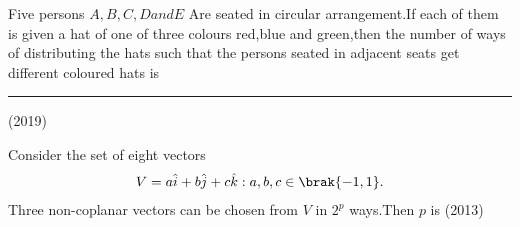 \item Five persons $A,B,C,D and E$ Are seated in circular arrangement.If each of them is given a hat of one of three colours red,blue and green,then the number of ways of distributing the hats such that the persons seated in adjacent seats get different coloured hats is \rule{1cm}{0.15mm}
\hfill(2019)\\

 


\item Consider the set of eight vectors
\begin{align}
V={a\hat{i}+b\hat{j}+c\hat{k}:a,b,c \in \brak{-1,1}}.
\end{align}
Three non-coplanar vectors can be chosen from $V$ in $2^p$ ways.Then $p$ is
\hfill(2013)


